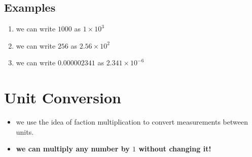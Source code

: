 \documentclass[11pt, oneside]{article}   	%
\begin{document}
\subsection{Examples}
\begin{enumerate}[label=Example \arabic*]
\item we can write $1000$ as $1 \times 10^{3}$
\item we can write $256$ as $2.56 \times 10^{2}$
\item we can write $0.000002341$ as $ 2.341 \times 10^{-6} $
\end{enumerate}



\section{Unit Conversion}
\begin{itemize}
\item we use the idea of faction multiplication to convert measurements between units. 
\item \textbf{we can multiply any number by $1$ without changing it!}
\end{itemize}
\end{document}
